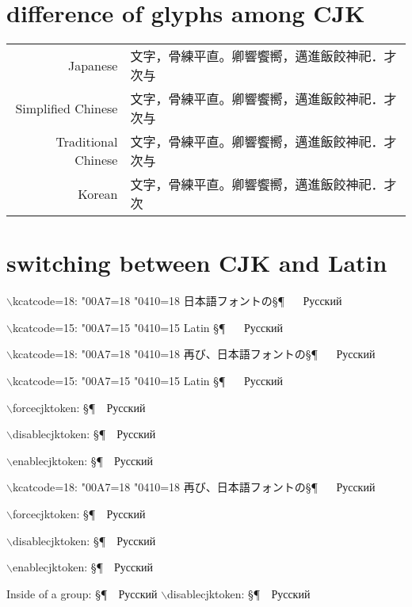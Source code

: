 \documentclass{ujarticle}
\DeclareRobustCommand\jpnrm{\kanjifamily{jpnrm}\selectfont}
\DeclareRobustCommand\schrm{\kanjifamily{schrm}\selectfont}
\DeclareRobustCommand\tchrm{\kanjifamily{tchrm}\selectfont}
\DeclareRobustCommand\korrm{\kanjifamily{korrm}\selectfont}
\begin{document}

\jpnrm
\section{difference of glyphs among CJK}
\begin{tabular}{rl}
Japanese & {\jpnrm 文字，骨練平直。卿響饗嚮，邁進飯餃神祀．才次与}\\
Simplified Chinese &  {\schrm 文字，骨練平直。卿響饗嚮，邁進飯餃神祀．才次与}\\
Traditional Chinese &  {\tchrm 文字，骨練平直。卿響饗嚮，邁進飯餃神祀．才次与}\\
Korean & {\korrm 文字，骨練平直。卿響饗嚮，邁進飯餃神祀．才次}\\
\end{tabular}

\section{switching between CJK and Latin}
\def\bs{{$\backslash$\kern0pt}}

\bs kcatcode=18: 
\kcatcode\ucs"00A7=18%
\kcatcode\ucs"0410=18%
日本語フォントの§¶
~~
Русский

\bs kcatcode=15: 
\kcatcode\ucs"00A7=15%
\kcatcode\ucs"0410=15%
Latin §¶
~~
\selectfont
Русский

\bs kcatcode=18: 
\kcatcode\ucs"00A7=18%
\kcatcode\ucs"0410=18%
再び、日本語フォントの§¶
~~
Русский

\bs kcatcode=15: 
\kcatcode\ucs"00A7=15%
\kcatcode\ucs"0410=15%
Latin §¶
~~
\selectfont
Русский

\forcecjktoken
\bs forcecjktoken: 
§¶~~Русский

\disablecjktoken
\bs disablecjktoken: 
§¶~~Русский

\enablecjktoken
\bs enablecjktoken: 
§¶~~Русский

\bs kcatcode=18: 
\kcatcode\ucs"00A7=18%
\kcatcode\ucs"0410=18%
再び、日本語フォントの§¶
~~
Русский

\forcecjktoken
\bs forcecjktoken: 
§¶~~Русский

\disablecjktoken
\bs disablecjktoken: 
§¶~~Русский

\enablecjktoken
\bs enablecjktoken: 
§¶~~Русский


{ Inside of a group: 
§¶~~Русский
\quad
\disablecjktoken
\bs disablecjktoken: 
§¶~~Русский
}
\end{document}
